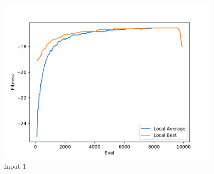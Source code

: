 \documentclass{standalone}
\begin{document}
\begin{figure}[!htb]
	\caption{Input 1}
	\label{fig:graph_1004}
	\includegraphics[width=\textwidth]{../graphs/graphs/1004.pdf}
\end{figure}
\end{document}
